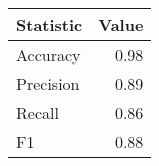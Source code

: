 \begin{table}[ht]
\centering
\begin{tabular}{lr}
  \hline
Statistic & Value \\ 
  \hline
Accuracy & 0.98 \\ 
  Precision & 0.89 \\ 
  Recall & 0.86 \\ 
  F1 & 0.88 \\ 
   \hline
\end{tabular}
\end{table}
